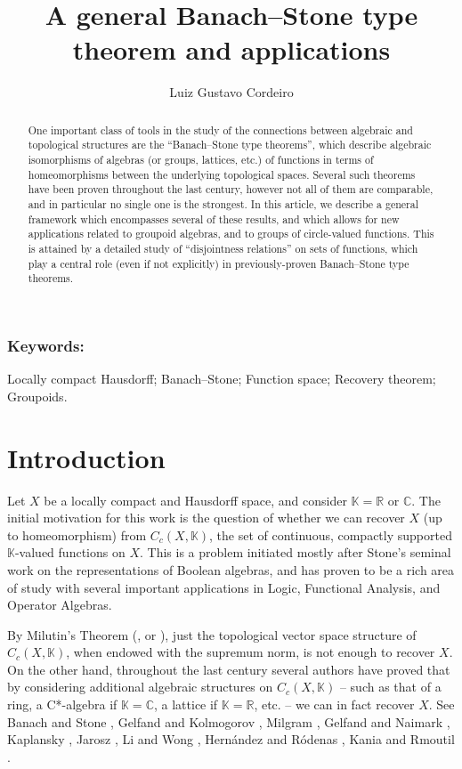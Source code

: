 \documentclass[letter,11pt]{amsart}
\title{A general Banach--Stone type theorem and applications}
\author{Luiz Gustavo Cordeiro}
\theoremstyle{plain}		\newtheorem{theorem}[generalnumbering]{Theorem}
\theoremstyle{plain}		\newtheorem{corollary}[generalnumbering]{Corollary}
\theoremstyle{definition}		\newtheorem{definition}[generalnumbering]{Definition}
\theoremstyle{definition}		\newtheorem{example}[generalnumbering]{Example}
\theoremstyle{plain}		\newtheorem{proposition}[generalnumbering]{Proposition}
\theoremstyle{plain}		\newtheorem{lemma}[generalnumbering]{Lemma}
\theoremstyle{plain}    \newtheorem{plainstyle}[generalnumbering]{\namefordifferentenvironment}
\theoremstyle{plain}    \newtheorem*{plainstyle*}{\namefordifferentenvironment}
\theoremstyle{definition}    \newtheorem{definitionstyle}[generalnumbering]{\namefordifferentenvironment}
\theoremstyle{definition}    \newtheorem*{definitionstyle*}{\namefordifferentenvironment}
\begin{document}
\begin{abstract}
	One important class of tools in the study of the connections between algebraic and topological structures are the ``Banach--Stone type theorems'', which describe algebraic isomorphisms of algebras (or groups, lattices, etc.) of functions in terms of homeomorphisms between the underlying topological spaces. Several such theorems have been proven throughout the last century, however not all of them are comparable, and in particular no single one is the strongest. In this article, we describe a general framework which encompasses several of these results, and which allows for new applications related to groupoid algebras, and to groups of circle-valued functions. This is attained by a detailed study of ``disjointness relations'' on sets of functions, which play a central role (even if not explicitly) in previously-proven Banach--Stone type theorems.
\end{abstract}

\maketitle

\subsubsection*{Keywords:} Locally compact Hausdorff; Banach--Stone; Function space; Recovery theorem; Groupoids.

\section*{Introduction}

Let $X$ be a locally compact and Hausdorff space, and consider $\mathbb{K}=\mathbb{R}$ or $\mathbb{C}$. The initial motivation for this work is the question of whether we can recover $X$ (up to homeomorphism) from $C_c(X,\mathbb{K})$, the set of continuous, compactly supported $\mathbb{K}$-valued functions on $X$. This is a problem initiated mostly after Stone's seminal work \cite{MR1501865} on the representations of Boolean algebras, and has proven to be a rich area of study with several important applications in Logic, Functional Analysis, and Operator Algebras.

By Milutin's Theorem (\cite{MR0206695}, or \cite[Chapter 36, Theorem 2.1]{MR1999613}), just the topological vector space structure of $C_c(X,\mathbb{K})$, when endowed with the supremum norm, is not enough to recover $X$. On the other hand, throughout the last century several authors have proved that by considering additional algebraic structures on $C_c(X,\mathbb{K})$ -- such as that of a ring, a C*-algebra if $\mathbb{K}=\mathbb{C}$, a lattice if $\mathbb{K}=\mathbb{R}$, etc. -- we can in fact recover $X$. See Banach and Stone \cite{MR1357166,MR1501905}, Gelfand and Kolmogorov \cite{gelfandkolmogorov1939}, Milgram \cite{MR0029476}, Gelfand and Naimark \cite{MR0009426}, Kaplansky \cite{MR0020715}, Jarosz \cite{MR1060366}, Li and Wong \cite{MR3162258}, Hernández and Ródenas \cite{MR2324919}, Kania and Rmoutil \cite{MR3813611}.
\end{document}
